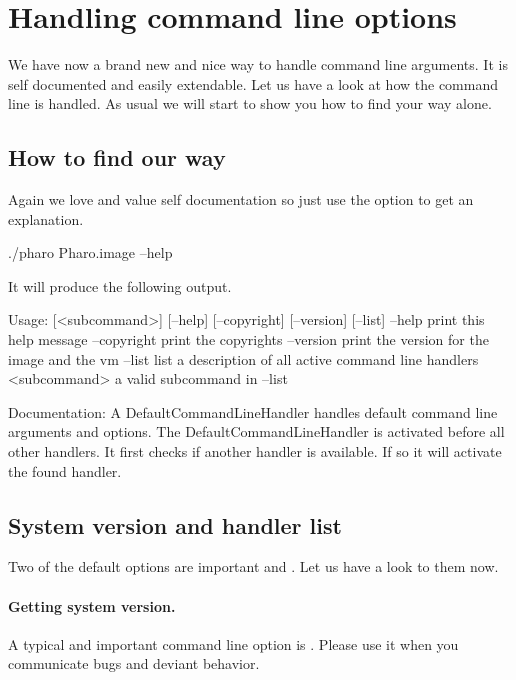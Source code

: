 \documentclass[a4paper,10pt,twoside]{book}
\begin{document}
\section{Handling command line options}
We have now a brand new and nice way to handle command line arguments. It is self documented and easily extendable. Let us have a look at how the command line is handled. As usual we will start to show you how to find your way alone.


\subsection{How to find our way}
Again we love and value self documentation so just use the   option to get an explanation. 

\begin{code}{}
./pharo Pharo.image --help
\end{code}

It will produce the following output.

\begin{code}{}
Usage: [<subcommand>] [--help] [--copyright] [--version] [--list]
	--help print this help message
	--copyright print the copyrights
	--version print the version for the image and the vm
	--list list a description of all active command line handlers
	<subcommand> a valid subcommand in --list
	
Documentation:
A DefaultCommandLineHandler handles default command line arguments and options.
The DefaultCommandLineHandler is activated before all other handlers. 
It first checks if another handler is available. If so it will activate the found handler.
\end{code}


\subsection{System version and handler list}
Two of the default options are important  and . Let us have a look to them now.



\paragraph{Getting system version.} A typical and important command line option is . Please use it when you communicate bugs and deviant behavior. 

\end{document}
